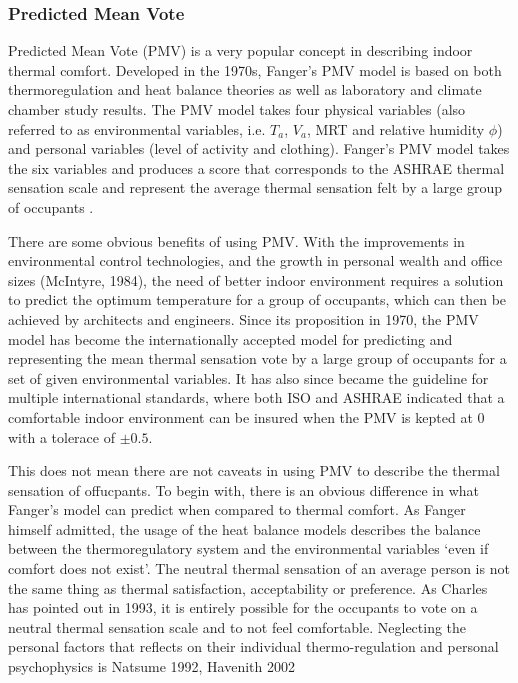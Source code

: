         
\subsubsection{Predicted Mean Vote}
        Predicted Mean Vote (PMV) is a very popular concept in describing indoor thermal comfort. Developed in the 1970s, Fanger's  PMV model is based on both thermoregulation and heat balance theories as well as laboratory and climate chamber study results. The PMV model takes four physical variables (also referred to as environmental variables, i.e. $T_a$, $V_a$, MRT and relative humidity $\phi$) and personal variables (level of activity and clothing). Fanger's PMV model takes the six variables and produces a score that corresponds to the ASHRAE thermal sensation scale and represent the average thermal sensation felt by a large group of occupants \cite{ashrae_thermal_2003,fanger_thermal_1970}. 
        
        There are some obvious benefits of using PMV. With the improvements in environmental control technologies, and the growth in personal wealth and office sizes (McIntyre, 1984), the need of better indoor environment requires a solution to predict the optimum temperature for a group of occupants, which can then be achieved by architects and engineers. Since its proposition in 1970, the PMV model has become the internationally accepted model for predicting and representing the mean thermal sensation vote by a large group of occupants for a set of given environmental variables. It has also since became the guideline for multiple international standards, where both ISO and ASHRAE indicated that a comfortable indoor environment can be insured when the PMV is kepted at 0 with a tolerace of $\pm0.5$.
        
        This does not mean there are not caveats in using PMV to describe the thermal sensation of offucpants. To begin with, there is an obvious difference in what Fanger's model can predict when compared to thermal comfort. As Fanger himself admitted, the usage of the heat balance models describes the balance between the thermoregulatory system and the environmental variables `even if comfort does not exist'. The neutral thermal sensation of an average person is not the same thing as thermal satisfaction, acceptability or preference. As Charles has pointed out in 1993, it is entirely possible for the occupants to vote on a neutral thermal sensation scale and to not feel comfortable. 
        Neglecting the personal factors that reflects on their individual thermo-regulation and personal psychophysics is Natsume 1992, Havenith 2002
        
